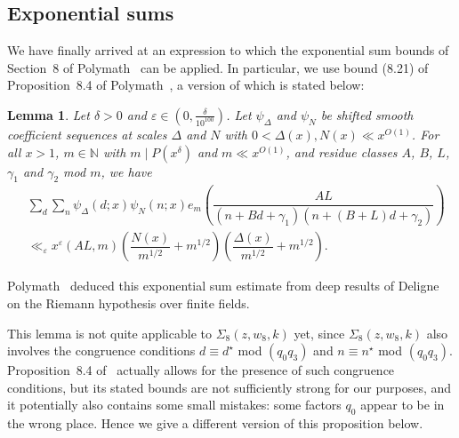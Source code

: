 \documentclass{amsart}
\newtheorem{lemma}{Lemma}
\numberwithin{equation}{section}
\begin{document}
\subsection{Exponential sums}

We have finally arrived at an expression to which the exponential sum bounds of Section~8 of  Polymath~\cite{Polymath:2014:EDZ} can be applied. In particular, we use bound (8.21) of Proposition~8.4 of Polymath~\cite{Polymath:2014:EDZ}, a version of which is stated below: 

\begin{lemma}  \label{lem:polymathprop8.4}
Let $\delta>0$ and  $\varepsilon\in(0,\frac{\delta}{10^{100}})$. Let $\psi_{\Delta}$ and $\psi_N$ be shifted smooth coefficient sequences at scales $\Delta$ and $N$ with $0<\Delta(x), N(x) \ll x^{O(1)}$. For all $x>1$, $m \in \mathbb{N}$ with $m \mid P(x^\delta)$  and $m \ll x^{O(1)}$, and residue classes $A$, $B$, $L$, $\gamma_1$ and $\gamma_2$  mod $m$, we have
\begin{align*}
&\sum_d \sum_n \psi_{\Delta}(d;x) \psi_N(n;x) e_m\left(\dfrac{AL}{(n+Bd+\gamma_1)(n+(B+L)d +\gamma_2)} \right) \\ &\ll_\varepsilon  x^\varepsilon (AL,m) \left(\dfrac{N(x)}{m^{1/2}} + m^{1/2} \right)\left(\dfrac{\Delta(x)}{m^{1/2}}  +  m^{1/2}\right).
\end{align*}
\end{lemma}
Polymath~\cite{Polymath:2014:EDZ} deduced this exponential sum estimate from deep results of 
Deligne on  the Riemann hypothesis over finite fields.

\vspace{3mm}
This lemma is not quite applicable to $\Sigma_8(z,w_8,k)$ yet, since $\Sigma_8(z,w_8,k)$ also involves the congruence conditions $d \equiv d^\star$ mod $(q_0q_3)$ and $n \equiv n^\star$ mod $(q_0q_3)$. Proposition~8.4 of~\cite{Polymath:2014:EDZ} actually allows for the presence of such congruence conditions, but its stated bounds are not sufficiently strong for our purposes, and it potentially also contains some small mistakes: some factors $q_0$ appear to be in the wrong place. Hence we give a different version of this proposition below. 
\end{document}
